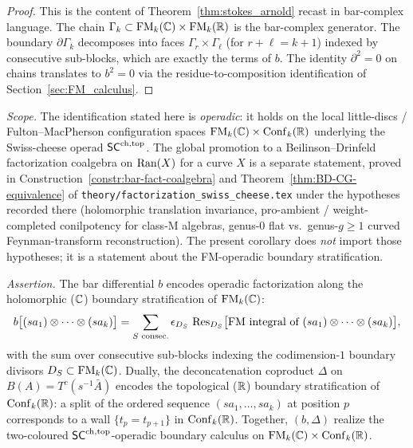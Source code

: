 \begin{proof}
This is the content of Theorem~\ref{thm:stokes_arnold} recast in
bar-complex language. The chain $\Gamma_k \subset
\operatorname{FM}_k(\mathbb{C}) \times \operatorname{FM}_k(\mathbb{R})$ is the bar-complex generator.
The boundary $\partial\Gamma_k$ decomposes into faces
$\Gamma_r \times \Gamma_\ell$ (for $r + \ell = k + 1$) indexed
by consecutive sub-blocks, which are exactly the terms of $b$.
The identity $\partial^2 = 0$ on chains translates to $b^2 = 0$
via the residue-to-composition identification of
Section~\ref{sec:FM_calculus}.
\end{proof}

\begin{corollary}[Bar differential $=$ \emph{operadic}
C-direction factorization on $\FM_k(\bC) \times \Conf_k(\bR)$;
\ClaimStatusProvedHere]
\emph{Scope.} The identification stated here is \emph{operadic}:
it holds on the local little-discs / Fulton--MacPherson
configuration spaces $\FM_k(\bC) \times \Conf_k(\bR)$ underlying
the Swiss-cheese operad $\mathsf{SC}^{\mathrm{ch,top}}$. The global promotion to a
Beilinson--Drinfeld factorization coalgebra on $\operatorname{Ran}(X)$ for a
curve $X$ is a separate statement, proved in
Construction~\ref{constr:bar-fact-coalgebra} and
Theorem~\ref{thm:BD-CG-equivalence} of
\texttt{theory/factorization\_swiss\_cheese.tex}
under the hypotheses recorded there
\textup{(}holomorphic translation invariance,
pro-ambient / weight-completed conilpotency for class-M
algebras, genus-$0$ flat vs.\ genus-$g \geq 1$ curved
Feynman-transform reconstruction\textup{)}. The present
corollary does \emph{not} import those hypotheses; it is a
statement about the FM-operadic boundary stratification.

\emph{Assertion.} The bar differential $b$ encodes operadic
factorization along the holomorphic ($\mathbb{C}$) boundary
stratification of $\operatorname{FM}_k(\mathbb{C})$:
\[
b\bigl[(sa_1) \otimes \cdots \otimes (sa_k)\bigr]
= \sum_{S \text{ consec.}} \epsilon_{D_S}\,
\operatorname{Res}_{D_S}\bigl[\text{FM integral of }
(sa_1) \otimes \cdots \otimes (sa_k)\bigr],
\]
with the sum over consecutive sub-blocks indexing the codimension-$1$
boundary divisors $D_S \subset \operatorname{FM}_k(\mathbb{C})$. Dually, the
deconcatenation coproduct $\Delta$ on $B(A) = T^c(s^{-1}\bar A)$
encodes the topological ($\mathbb{R}$) boundary stratification of
$\operatorname{Conf}_k(\mathbb{R})$: a split of the ordered sequence
$(sa_1, \ldots, sa_k)$ at position $p$ corresponds to a wall
$\{t_p = t_{p+1}\}$ in $\operatorname{Conf}_k(\mathbb{R})$. Together,
$(b, \Delta)$ realize the two-coloured
$\mathsf{SC}^{\mathrm{ch,top}}$-operadic boundary calculus on
$\FM_k(\bC) \times \Conf_k(\bR)$.
\end{corollary}

